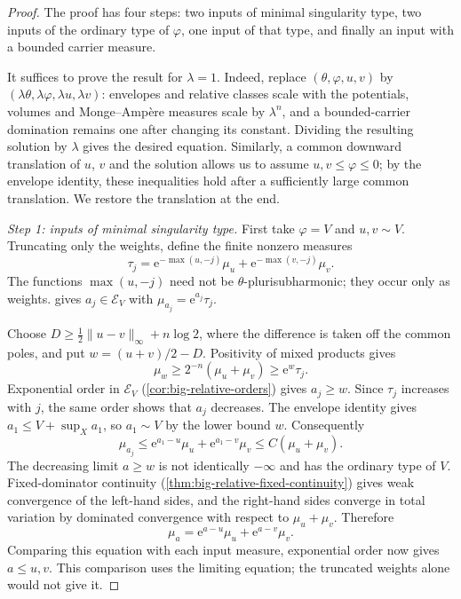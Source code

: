 \begin{proof}
The proof has four steps: two inputs of minimal singularity type, two inputs of the ordinary type of $\varphi$, one input of that type, and finally an input with a bounded carrier measure.

It suffices to prove the result for $\lambda=1$. Indeed, replace $(\theta,\varphi,u,v)$ by $(\lambda\theta,\lambda\varphi,\lambda u,\lambda v)$: envelopes and relative classes scale with the potentials, volumes and Monge--Amp\`ere measures scale by $\lambda^n$, and a bounded-carrier domination remains one after changing its constant. Dividing the resulting solution by $\lambda$ gives the desired equation. Similarly, a common downward translation of $u$, $v$ and the solution allows us to assume $u,v\leq\varphi\leq0$; by the envelope identity, these inequalities hold after a sufficiently large common translation. We restore the translation at the end.

\emph{Step 1: inputs of minimal singularity type.}
First take $\varphi=V$ and $u,v\sim V$. Truncating only the weights, define the finite nonzero measures
\[
 \tau_j=\mathrm{e}^{-\max(u,-j)}\mu_u+\mathrm{e}^{-\max(v,-j)}\mu_v.
\]
The functions $\max(u,-j)$ need not be $\theta$-plurisubharmonic; they occur only as weights.  gives $a_j\in\mathcal E_V$ with $\mu_{a_j}=\mathrm{e}^{a_j}\tau_j$.

Choose $D\geq\tfrac12\|u-v\|_\infty+n\log2$, where the difference is taken off the common poles, and put $w=(u+v)/2-D$. Positivity of mixed products gives
\[
 \mu_w\geq2^{-n}(\mu_u+\mu_v)\geq \mathrm{e}^w\tau_j.
\]
Exponential order in $\mathcal E_V$ (\cref{cor:big-relative-orders}) gives $a_j\geq w$. Since $\tau_j$ increases with $j$, the same order shows that $a_j$ decreases. The envelope identity gives $a_1\leq V+\sup_Xa_1$, so $a_1\sim V$ by the lower bound $w$. Consequently
\[
 \mu_{a_j}
 \leq \mathrm{e}^{a_1-u}\mu_u+\mathrm{e}^{a_1-v}\mu_v
 \leq C(\mu_u+\mu_v).
\]
The decreasing limit $a\geq w$ is not identically $-\infty$ and has the ordinary type of $V$. Fixed-dominator continuity (\cref{thm:big-relative-fixed-continuity}) gives weak convergence of the left-hand sides, and the right-hand sides converge in total variation by dominated convergence with respect to $\mu_u+\mu_v$. Therefore
\[
 \mu_a=\mathrm{e}^{a-u}\mu_u+\mathrm{e}^{a-v}\mu_v.
\]
Comparing this equation with each input measure, exponential order now gives $a\leq u,v$. This comparison uses the limiting equation; the truncated weights alone would not give it.


\end{proof}
